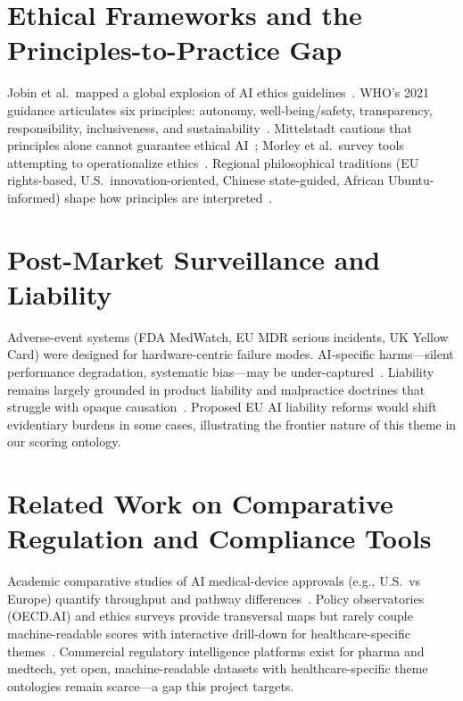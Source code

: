 \section{Ethical Frameworks and the Principles-to-Practice Gap}
\label{sec:ethics}

Jobin et al.\ mapped a global explosion of AI ethics guidelines~\cite{jobin2019}. WHO's 2021 guidance articulates six principles: autonomy, well-being/safety, transparency, responsibility, inclusiveness, and sustainability~\cite{who2021}. Mittelstadt cautions that principles alone cannot guarantee ethical AI~\cite{mittelstadt2019}; Morley et al.\ survey tools attempting to operationalize ethics~\cite{morley2020}. Regional philosophical traditions (EU rights-based, U.S.\ innovation-oriented, Chinese state-guided, African Ubuntu-informed) shape how principles are interpreted~\cite{who2021}.

\section{Post-Market Surveillance and Liability}
\label{sec:pms}

Adverse-event systems (FDA MedWatch, EU MDR serious incidents, UK Yellow Card) were designed for hardware-centric failure modes. AI-specific harms---silent performance degradation, systematic bias---may be under-captured~\cite{petersen2022}. Liability remains largely grounded in product liability and malpractice doctrines that struggle with opaque causation~\cite{price2019}. Proposed EU AI liability reforms would shift evidentiary burdens in some cases, illustrating the frontier nature of this theme in our scoring ontology.

\section{Related Work on Comparative Regulation and Compliance Tools}
\label{sec:related}

Academic comparative studies of AI medical-device approvals (e.g., U.S.\ vs Europe) quantify throughput and pathway differences~\cite{muehlematter2021}. Policy observatories (OECD.AI) and ethics surveys provide transversal maps but rarely couple machine-readable scores with interactive drill-down for healthcare-specific themes~\cite{oecdai,jobin2019}. Commercial regulatory intelligence platforms exist for pharma and medtech, yet open, machine-readable datasets with healthcare-specific theme ontologies remain scarce---a gap this project targets.

